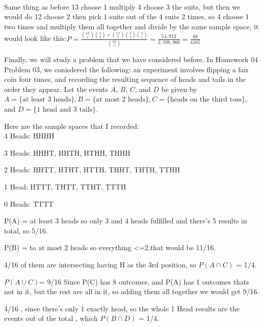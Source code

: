 \documentclass[12pt]{article}
\begin{document}
\begin{enumerate}
\\
Same thing as before 13 choose 1 multiply 4 choose 3 the suits, but then we would do 12 choose 2 then pick 1 suits out of the 4 suits 2 times, so 4 choose 1 two times and multiply them all together and divide by the same sample space, it would look like this:$P = \frac{\binom{13}{1}\binom{4}{3} \times \binom{12}{2}\binom{4}{1}\binom{4}{1}}{\binom{52}{5}} = \frac{54,912}{2,598,960} = \frac{88}{4165}$
\end{enumerate}


\problem Finally, we will study a problem that we have considered before. In Homework 04 Problem 03, we conisdered the following: an experiment involves flipping a fair coin four times, and recording the resulting sequence of heads and tails in the order they appear. Let the events $A$, $B$, $C$, and $D$ be given by $A = \{\text{at least 3 heads} \}, B = \{\text{at most 2 heads} \}, C = \{ \text{heads on the third toss} \}$, and $D = \{\text{1 head and 3 tails} \}$. 

\begin{enumerate}


Here are the sample spaces that I recorded:\\
4 Heads: HHHH

3 Heads: HHHT, HHTH, HTHH, THHH

2 Heads: HHTT, HTHT, HTTH, THHT, THTH, TTHH

1 Head: HTTT, THTT, TTHT, TTTH

0 Heads: TTTT

P(A) = at least 3 heads so only 3 and 4 heads fulfilled and there's 5  results in total, so 5/16.


P(B) = to at most 2 heads so everything <=2,that would be 11/16. 


4/16 of them are intersecting having H as the 3rd position, so $P(A \cap C)$ = 1/4. 


$P(A \cup C)$= 9/16 Since P(C) has 8 outcomes, and P(A) has 1 outcomes thats not in it, but the rest are all in it, so adding them all together we would get 9/16. 


4/16 , since there's only 1 exactly head, so the whole 1 Head results are the events out of the total , which $P(B \cap D)$ = 1/4. 
\end{enumerate}
\end{document}
